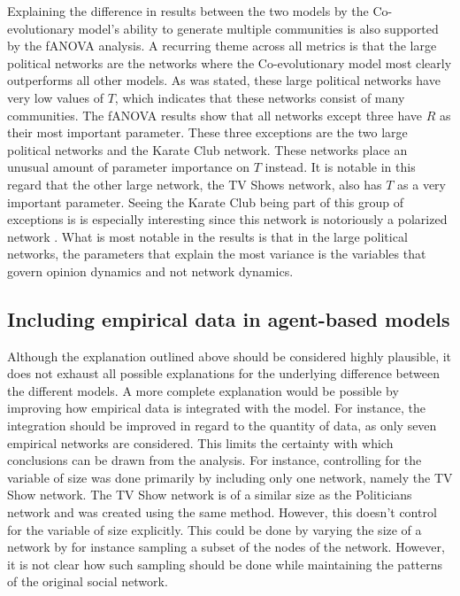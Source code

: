 \documentclass[11pt]{article}
\begin{document}
\noindent Explaining the difference in results between the two models by the Co-evolutionary model's ability to generate multiple communities is also supported by the fANOVA analysis. 
A recurring theme across all metrics is that the large political networks are the networks where the Co-evolutionary model most clearly outperforms all other models. 
As was stated, these large political networks have very low values of $T$, which indicates that these networks consist of many communities. 
The fANOVA results show that all networks except three have $R$ as their most important parameter. These three exceptions are the two large political networks and the Karate Club network. These networks place an unusual amount of parameter importance on $T$ instead. It is notable in this regard that the other large network, the TV Shows network, also has $T$ as a very important parameter.
Seeing the Karate Club being part of this group of exceptions is is especially interesting since this network is notoriously a polarized network \cite{zachary_information_1977}. What is most notable in the results is that in the large political networks, the parameters that explain the most variance is the variables that govern opinion dynamics and not network dynamics.

\subsection{Including empirical data in agent-based models}
Although the explanation outlined above should be considered highly plausible, it does not exhaust all possible explanations for the underlying difference between the different models. A more complete explanation would be possible by improving how empirical data is integrated with the model. 
For instance, the integration should be improved in regard to the quantity of data, as only seven empirical networks are considered. This limits the certainty with which conclusions can be drawn from the analysis. For instance, controlling for the variable of size was done primarily by including only one network, namely the TV Show network. The TV Show network is of a similar size as the Politicians network and was created using the same method. However, this doesn't control for the variable of size explicitly. This could be done by varying the size of a network by for instance sampling a subset of the nodes of the network. However, it is not clear how such sampling should be done while maintaining the patterns of the original social network. 
\end{document}
